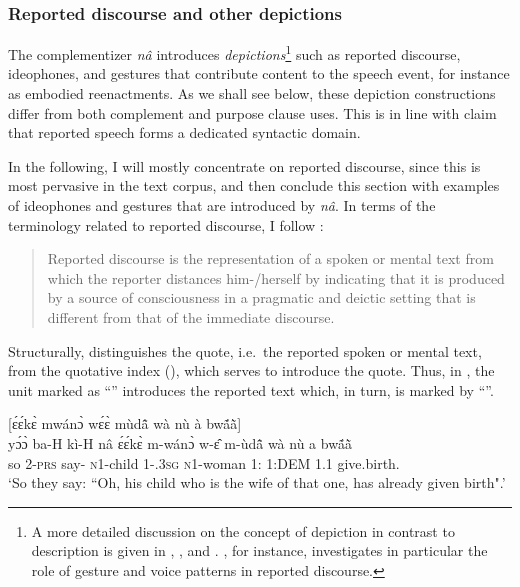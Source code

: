 \subsubsection{Reported discourse and other depictions}
\label{sec:RD}

The complementizer {\itshape nâ} introduces {\itshape depictions}\footnote{A more detailed discussion on the concept of depiction in contrast to description is given in \citet{clark90}, \citet{guldemann2008}, and \citet{dingemanse2015}. \citet{soulaimani2018}, for instance, investigates in particular the role of gesture and voice patterns in reported discourse.} such as reported discourse, ideophones, and gestures that contribute content to the speech event, for instance as embodied reenactments.
As we shall see below, these depiction constructions differ from both complement and purpose clause uses. This is in line with  claim that reported speech forms a dedicated syntactic domain. 

In the following, I will mostly concentrate on reported discourse, since this is most pervasive in the text corpus, and then conclude this section with examples of ideophones and gestures that are introduced by {\itshape nâ}.
In terms of the terminology related to reported discourse, I follow \citet[6]{guldemann2008}:

\begin{quote}
Reported discourse is the representation of a spoken or mental text from which the reporter distances him-/herself by indicating that it is produced by a source of consciousness in a pragmatic and deictic setting that is different from that of the immediate discourse.
\end{quote}

Structurally, \citet{guldemann2008} distinguishes the quote, i.e.\ the reported spoken or mental text, from the quotative index ({\QI}), which serves to introduce the quote. Thus, in , the unit marked as ``{\QI}'' introduces the reported text which, in turn, is marked by ``{\RD}''.

\ea\label{RS}
  \glll  [yɔ́ɔ̀ bá kí {\bfseries nâ}]\textsubscript{{\QI}} [ɛ́ɛ́kɛ̀ mwánɔ̀ wɛ́ɛ̀ mùdã̂ wà nù à bwã́ã̀]\textsubscript{{\RD}}\\
         {\db}yɔ́ɔ̀ ba-H kì-H nâ {\db}ɛ́ɛ́kɛ̀ m-wánɔ̀ w-ɛ̂ m-ùdã̂ wà nù a bwã́ã̀ \\
         {\db}so 2-\textsc{prs} say-{\R} {\COMP} {\db}{\EXCL} \textsc{n}1-child 1-{\POSS}.3\textsc{sg} \textsc{n}1-woman 1:{\ATT} 1:DEM 1.{\PST}1 give.birth.{\PRF} \\
    \trans `So they say: ``Oh, his child who is the wife of that one, has already given birth".'
\z

